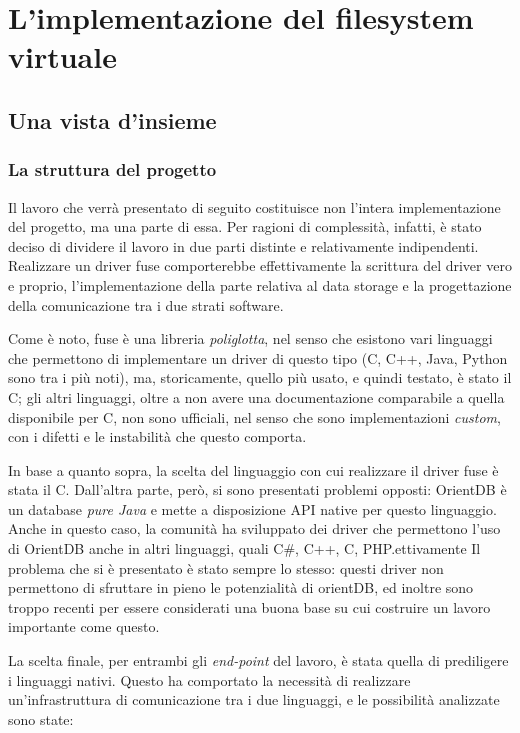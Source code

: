 \chapter{L'implementazione del filesystem virtuale}

\section{Una vista d'insieme}
\subsection{La struttura del progetto}
Il lavoro che verrà presentato di seguito costituisce non l'intera implementazione del progetto, ma una parte di essa. Per ragioni di complessità, infatti, è stato deciso di dividere il lavoro in due parti distinte e relativamente indipendenti.
Realizzare un driver fuse comporterebbe effettivamente la scrittura del driver vero e proprio, l'implementazione della parte relativa al data storage e la progettazione della comunicazione tra i due strati software.

Come è noto, fuse è una libreria \emph{poliglotta}, nel senso che esistono vari linguaggi che permettono di implementare un driver di questo tipo (C, C++, Java, Python sono tra i più noti), ma, storicamente, quello più usato, e quindi testato, è stato il C; gli altri linguaggi, oltre a non avere una documentazione comparabile a quella disponibile per C, non sono ufficiali, nel senso che sono implementazioni \emph{custom}, con i difetti e le instabilità che questo comporta.

In base a quanto sopra, la scelta del linguaggio con cui realizzare il driver fuse è stata il C. Dall'altra parte, però, si sono presentati problemi opposti: OrientDB è un database \emph{pure Java} e mette a disposizione API native per questo linguaggio. Anche in questo caso, la comunità ha sviluppato dei driver che permettono l'uso di OrientDB anche in altri linguaggi, quali C\#, C++, C, PHP.ettivamente
Il problema che si è presentato è stato sempre lo stesso: questi driver non permettono di sfruttare in pieno le potenzialità di orientDB, ed inoltre sono troppo recenti per essere considerati una buona base su cui costruire un lavoro importante come questo.

La scelta finale, per entrambi gli \emph{end-point} del lavoro, è stata quella di prediligere i linguaggi nativi. Questo ha comportato la necessità di realizzare un'infrastruttura di comunicazione tra i due linguaggi, e le possibilità analizzate sono state:


